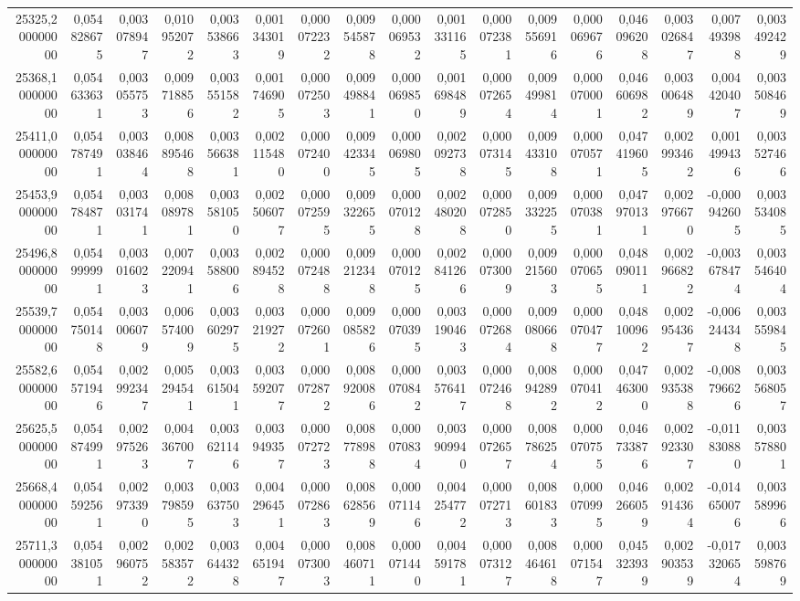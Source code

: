\begin{longtable}{rrrrrrrrrrrrrrrrr}
25325,200000000 & 0,054828675 & 0,003078947 & 0,010952072 & 0,003538663 & 0,001343019 & 0,000072232 & 0,009545878 & 0,000069532 & 0,001331165 & 0,000072381 & 0,009556916 & 0,000069676 & 0,046096208 & 0,003026847 & 0,007493988 & 0,003492429\\
25368,100000000 & 0,054633631 & 0,003055753 & 0,009718856 & 0,003551582 & 0,001746905 & 0,000072503 & 0,009498841 & 0,000069850 & 0,001698489 & 0,000072654 & 0,009499814 & 0,000070001 & 0,046606982 & 0,003006489 & 0,004420407 & 0,003508469\\
25411,000000000 & 0,054787491 & 0,003038464 & 0,008895468 & 0,003566381 & 0,002115480 & 0,000072400 & 0,009423345 & 0,000069805 & 0,002092738 & 0,000073145 & 0,009433108 & 0,000070571 & 0,047419605 & 0,002993462 & 0,001499436 & 0,003527466\\
25453,900000000 & 0,054784871 & 0,003031741 & 0,008089781 & 0,003581050 & 0,002506077 & 0,000072595 & 0,009322655 & 0,000070128 & 0,002480208 & 0,000072850 & 0,009332255 & 0,000070381 & 0,047970131 & 0,002976670 & -0,000942605 & 0,003534085\\
25496,800000000 & 0,054999991 & 0,003016023 & 0,007220941 & 0,003588006 & 0,002894528 & 0,000072488 & 0,009212348 & 0,000070125 & 0,002841266 & 0,000073009 & 0,009215603 & 0,000070655 & 0,048090111 & 0,002966822 & -0,003678474 & 0,003546404\\
25539,700000000 & 0,054750148 & 0,003006079 & 0,006574009 & 0,003602975 & 0,003219272 & 0,000072601 & 0,009085826 & 0,000070395 & 0,003190463 & 0,000072684 & 0,009080668 & 0,000070477 & 0,048100962 & 0,002954367 & -0,006244348 & 0,003559845\\
25582,600000000 & 0,054571946 & 0,002992347 & 0,005294541 & 0,003615041 & 0,003592077 & 0,000072872 & 0,008920086 & 0,000070842 & 0,003576417 & 0,000072468 & 0,008942892 & 0,000070412 & 0,047463000 & 0,002935388 & -0,008796626 & 0,003568057\\
25625,500000000 & 0,054874991 & 0,002975263 & 0,004367007 & 0,003621146 & 0,003949357 & 0,000072723 & 0,008778988 & 0,000070834 & 0,003909940 & 0,000072657 & 0,008786254 & 0,000070755 & 0,046733876 & 0,002923307 & -0,011830880 & 0,003578801\\
25668,400000000 & 0,054592561 & 0,002973390 & 0,003798595 & 0,003637503 & 0,004296451 & 0,000072863 & 0,008628569 & 0,000071146 & 0,004254772 & 0,000072713 & 0,008601833 & 0,000070995 & 0,046266059 & 0,002914364 & -0,014650076 & 0,003589966\\
25711,300000000 & 0,054381051 & 0,002960752 & 0,002583572 & 0,003644328 & 0,004651947 & 0,000073003 & 0,008460711 & 0,000071440 & 0,004591781 & 0,000073127 & 0,008464618 & 0,000071547 & 0,045323939 & 0,002903539 & -0,017320654 & 0,003598769\\

\end{longtable}
